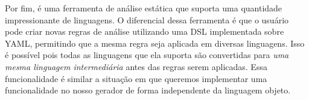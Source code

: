 Por fim, \cite{r2c:semgrep} é uma ferramenta de análise estática que suporta uma
quantidade impressionante de linguagens. O diferencial dessa ferramenta é que
o usuário pode criar novas regras de análise utilizando uma DSL implementada sobre
YAML, permitindo que a mesma regra seja aplicada em diversas linguagens. Isso
é possível pois todas as linguagens que ela suporta são convertidas para
\textit{uma mesma linguagem intermediária} antes das regras serem aplicadas. Essa
funcionalidade é similar a situação em que queremos implementar uma funcionalidade
no nosso gerador de forma independente da linguagem objeto.
